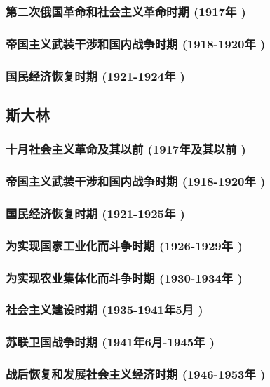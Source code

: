 \documentclass[UTF8]{../RepresentationUniverse}
\begin{document}
    \subsubsection{第二次俄国革命和社会主义革命时期 (1917年 )}
    \subsubsection{帝国主义武装干涉和国内战争时期 (1918-1920年 )}
    \subsubsection{国民经济恢复时期 (1921-1924年 )}


\subsection{斯大林}
    \subsubsection{十月社会主义革命及其以前 (1917年及其以前 )}
    \subsubsection{帝国主义武装干涉和国内战争时期 (1918-1920年 )}
    \subsubsection{国民经济恢复时期 (1921-1925年 )}
    \subsubsection{为实现国家工业化而斗争时期 (1926-1929年 )}
    \subsubsection{为实现农业集体化而斗争时期 (1930-1934年 )}
    \subsubsection{社会主义建设时期 (1935-1941年5月 )}
    \subsubsection{苏联卫国战争时期 (1941年6月-1945年 )}
    \subsubsection{战后恢复和发展社会主义经济时期 (1946-1953年 )}
\end{document}
